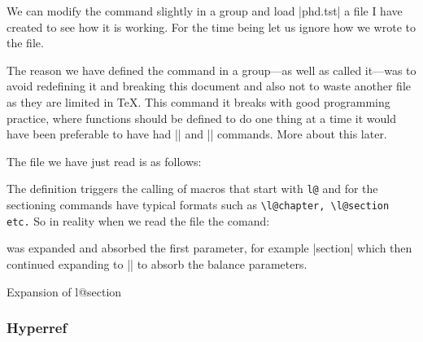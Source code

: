 We can modify the command slightly in a group and load |phd.tst| a file I have created to see how it is working. For the time being let us ignore how we wrote to the file.


The reason we have defined the command in a group---as well as called it---was to avoid redefining it and breaking this document and also not to waste another file as they are limited in TeX. This command it breaks with good programming practice, where functions should be defined to do one thing at a time it would have been preferable to have had |\@readtoc| and  |\@writetoc| commands. More about this later.

The file we have just read is as follows:

\begin{teXXX}
\end{teXXX}

The  definition triggers the calling of macros that start with \verb+l@+ and for the sectioning commands have typical formats such as \lstinline{\l@chapter, \l@section etc.} So in reality when we read the
file the comand:
\begin{teX}
\def\contentsline#1{\csname l@#1\endcsname}
\end{teX}
was expanded and absorbed the first parameter, for example |{section}| which then continued expanding to |\l@section| to absorb the balance parameters.

\begin{texexample}{Expansion of l@section}{}
\makeatletter
{}
\makeatother
\end{texexample}

\subsubsection{Hyperref}

